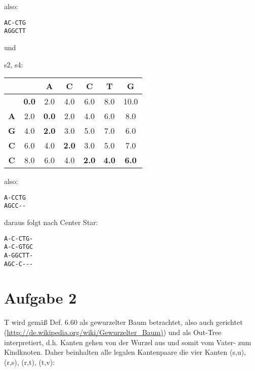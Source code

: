 \documentclass[a4paper,10pt,oneside,leqno]{scrartcl}
\begin{document}
also:
\begin{verbatim}
AC-CTG
AGGCTT
\end{verbatim}

und

s2, s4: \\
\begin{tabular}{c|cccccc}
& \textbf{ } & \textbf{A} & \textbf{C} & \textbf{C} & \textbf{T} & \textbf{G}\\\hline
\textbf{ } & \textbf{0.0} & 2.0 & 4.0 & 6.0 & 8.0 & 10.0\\
\textbf{A} & 2.0 & \textbf{0.0} & 2.0 & 4.0 & 6.0 & 8.0\\
\textbf{G} & 4.0 & \textbf{2.0} & 3.0 & 5.0 & 7.0 & 6.0\\
\textbf{C} & 6.0 & 4.0 & \textbf{2.0} & 3.0 & 5.0 & 7.0\\
\textbf{C} & 8.0 & 6.0 & 4.0 & \textbf{2.0} & \textbf{4.0} & \textbf{6.0}\\
\end{tabular}

also:
\begin{verbatim}
A-CCTG
AGCC--
\end{verbatim}

daraus folgt nach Center Star:

\begin{verbatim}
A-C-CTG-
A-C-GTGC
A-GGCTT-
AGC-C---
\end{verbatim}

\section*{Aufgabe 2}
T wird gemäß Def. 6.60 als gewurzelter Baum betrachtet, also auch gerichtet (\url{http://de.wikipedia.org/wiki/Gewurzelter\_Baum)})
und als Out-Tree interpretiert, d.h. Kanten gehen von der Wurzel aus und somit vom Vater- zum Kindknoten.
Daher beinhalten alle legalen Kantenpaare die vier Kanten (s,u), (r,s), (r,t), (t,v):
\end{document}
